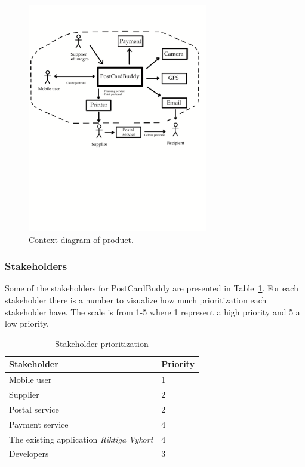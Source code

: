 \documentclass[10pt,a4paper]{article}
\begin{document}
\begin{figure}[h!]
\centering
\includegraphics[width=0.7\textwidth]{ContextDiagram2.pdf}
\caption{Context diagram of product.}
\label{fig:context}
\end{figure}

\subsubsection{Stakeholders}
Some of the stakeholders for PostCardBuddy are presented in Table~\ref{table:stakeholder}. For each stakeholder there is a number to visualize how much prioritization each stakeholder have. The scale is from 1-5 where 1 represent a high priority and 5 a low priority.


\begin{table}[h!]
\centering
\label{table:deliv}
\begin{tabular}{|l|l|} \hline
\textbf{Stakeholder} & \textbf{Priority} \\
\hline
Mobile user & 1\\
\hline
Supplier & 2\\
\hline
Postal service & 2\\
\hline
Payment service & 4\\
\hline
The existing application \textit{Riktiga Vykort} & 4\\
\hline
Developers & 3\\
\hline
\end{tabular}\\
\caption{Stakeholder prioritization}
\label{table:stakeholder}
\end{table}
\end{document}
